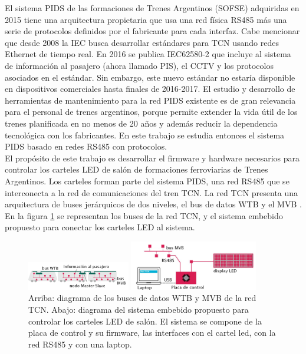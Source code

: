 \documentclass[conference]{IEEEtran}
\begin{document}
El sistema PIDS de las formaciones de Trenes Argentinos (SOFSE) adquiridas en 2015 tiene una arquitectura propietaria que usa una red física RS485 más una serie de protocolos definidos por el fabricante para cada interfaz. Cabe mencionar que desde 2008 \cite{b6} la IEC busca desarrollar estándares para TCN usando redes Ethernet de tiempo real. En 2016 se publica  IEC62580-2 que incluye al sistema de información al pasajero (ahora llamado PIS), el CCTV y los protocolos asociados en el estándar. Sin embargo, este nuevo estándar no estaría disponible en dispositivos comerciales hasta finales de 2016-2017. El estudio y desarrollo de herramientas de mantenimiento para la red PIDS existente es de gran relevancia para el personal de trenes argentinos, porque permite extender la vida útil de los trenes planificada en no menos de 20 años y además reducir la dependencia tecnológica con los fabricantes. En este trabajo se estudia entonces el sistema PIDS basado en redes RS485 con protocolos.\\

El propósito de este trabajo es desarrollar el firmware y hardware necesarios para controlar los carteles LED de salón de formaciones ferroviarias de Trenes Argentinos. Los carteles forman parte del sistema PIDS, una red RS485 que se interconecta a la red de comunicaciones del tren TCN. La red TCN presenta una arquitectura de buses jerárquicos de dos niveles, el bus de datos WTB y el MVB \cite{b7}. En la figura \ref{fig.embeddedSystem} se representan los buses de la red TCN, y el sistema embebido propuesto para conectar los carteles LED al sistema.\\


\begin{figure}[htbp]
\centerline{\includegraphics[width=0.4\textwidth]{diagramaRedTCN.png}}
\vspace{0.4cm}
\centerline{\includegraphics[width=0.5\textwidth]{diagramaPIDSCIAA.png}}
\caption{Arriba: diagrama de los buses de datos WTB y MVB de la red TCN. Abajo: diagrama del sistema embebido propuesto para controlar los carteles LED de salón. El sistema se compone de la placa de control y su firmware, las interfaces con el cartel led, con la red RS485 y con una laptop.}
\label{fig.embeddedSystem}
\end{figure}
\end{document}
